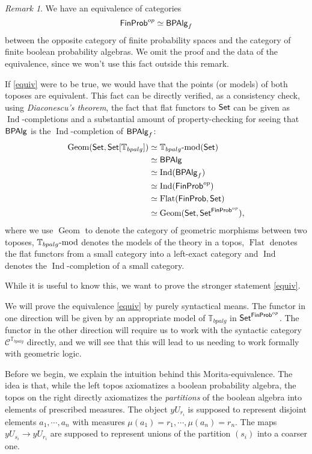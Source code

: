 \documentclass[a4paper]{amsproc}
\theoremstyle{plain}
\theoremstyle{definition}
\theoremstyle{remark}
\newtheorem{remark}[theorem]{Remark}
\numberwithin{equation}{section}
\newcommand{\y}{\textit{y}}
\DeclareMathOperator{\Geom}{Geom}
\DeclareMathOperator{\Ind}{Ind}
\DeclareMathOperator{\Flat}{Flat}
\newcommand{\Set}{\textup{\textsf{Set}}}
\newcommand{\FinProb}{\textup{\textsf{FinProb}}}
\newcommand{\BPAlg}{\textup{\textsf{BPAlg}}}
\begin{document}
\begin{remark}
    We have an equivalence of categories
    \[
        \FinProb^{op} \simeq \BPAlg_f
    \]
    between the opposite category of finite probability spaces and the category of finite boolean probability algebras. We omit the proof and the data of the equivalence, since we won't use this fact outside this remark.

    If \ref{equiv} were to be true, we would have that the points (or models) of both toposes are equivalent. This fact can be directly verified, as a consistency check, using \emph{Diaconescu's theorem}, the fact that flat functors to $\Set$ can be given as $\Ind$-completions and a substantial amount of property-checking for seeing that $\BPAlg$ is the $\Ind$-completion of $\BPAlg_f$:
    \begin{align*}
        \Geom(\Set,\Set[\mathbb{T}_{bpalg}]) &\simeq \mathbb{T}_{bpalg}\textup{-mod}(\Set) \\
        &\simeq \BPAlg \\
        &\simeq \Ind(\BPAlg_f) \\
        &\simeq \Ind(\FinProb^{op}) \\
        &\simeq \Flat(\FinProb, \Set) \\
        &\simeq \Geom(\Set, \Set^{\FinProb^{op}}) ,
    \end{align*}
    where we use $\Geom$ to denote the category of geometric morphisms between two toposes, $\mathbb{T}_{bpalg}\textup{-mod}$ denotes the models of the theory in a topos, $\Flat$ denotes the flat functors from a small category into a left-exact category and $\Ind$ denotes the $\Ind$-completion of a small category.

    While it is useful to know this, we want to prove the stronger statement \ref{equiv}.
\end{remark}

We will prove the equivalence \ref{equiv} by purely syntactical means. The functor in one direction will be given by an appropriate model of $\mathbb{T}_{bpalg}$ in $\Set^{\FinProb^{op}}$. The functor in the other direction will require us to work with the syntactic category $\mathcal{C}^{\mathbb{T}_{bpalg}}$ directly, and we will see that this will lead to us needing to work formally with geometric logic.

Before we begin, we explain the intuition behind this Morita-equivalence. The idea is that, while the left topos axiomatizes a boolean probability algebra, the topos on the right directly axiomatizes the \emph{partitions} of the boolean algebra into elements of prescribed measures. The object $\y U_{r_i}$ is supposed to represent disjoint elements $a_1,\cdots,a_n$ with measures $\mu(a_1) = r_1,\cdots,\mu(a_n) = r_n$. The maps $\y U_{s_i} \to \y U_{r_i}$ are supposed to represent unions of the partition $(s_i)$ into a coarser one.
\end{document}
